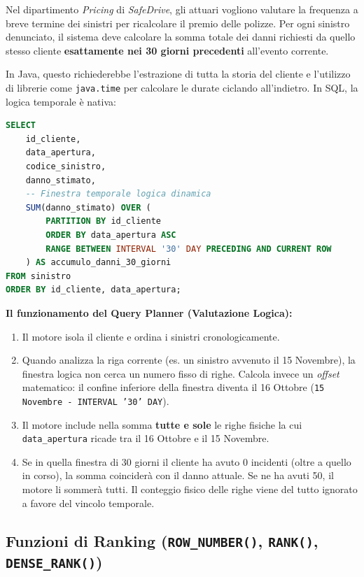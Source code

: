 \begin{example}
Nel dipartimento \textit{Pricing} di \textit{SafeDrive}, gli attuari vogliono valutare la frequenza a breve termine dei sinistri per ricalcolare il premio delle polizze. Per ogni sinistro denunciato, il sistema deve calcolare la somma totale dei danni richiesti da quello stesso cliente \textbf{esattamente nei 30 giorni precedenti} all'evento corrente.

In Java, questo richiederebbe l'estrazione di tutta la storia del cliente e l'utilizzo di librerie come \texttt{java.time} per calcolare le durate ciclando all'indietro. In SQL, la logica temporale è nativa:

\begin{lstlisting}[language=SQL, basicstyle=\ttfamily\small, keywordstyle=\color{blue}\bfseries]
SELECT 
    id_cliente,
    data_apertura,
    codice_sinistro,
    danno_stimato,
    -- Finestra temporale logica dinamica
    SUM(danno_stimato) OVER (
        PARTITION BY id_cliente
        ORDER BY data_apertura ASC
        RANGE BETWEEN INTERVAL '30' DAY PRECEDING AND CURRENT ROW
    ) AS accumulo_danni_30_giorni
FROM sinistro
ORDER BY id_cliente, data_apertura;
\end{lstlisting}

\textbf{Il funzionamento del Query Planner (Valutazione Logica):}
\begin{enumerate}
    \item Il motore isola il cliente e ordina i sinistri cronologicamente.
    \item Quando analizza la riga corrente (es. un sinistro avvenuto il 15 Novembre), la finestra logica non cerca un numero fisso di righe. Calcola invece un \textit{offset} matematico: il confine inferiore della finestra diventa il 16 Ottobre (\texttt{15 Novembre - INTERVAL '30' DAY}).
    \item Il motore include nella somma \textbf{tutte e sole} le righe fisiche la cui \texttt{data\_apertura} ricade tra il 16 Ottobre e il 15 Novembre.
    \item Se in quella finestra di 30 giorni il cliente ha avuto 0 incidenti (oltre a quello in corso), la somma coinciderà con il danno attuale. Se ne ha avuti 50, il motore li sommerà tutti. Il conteggio fisico delle righe viene del tutto ignorato a favore del vincolo temporale.
\end{enumerate}
\end{example}

\subsection{Funzioni di Ranking (\texttt{ROW\_NUMBER()}, \texttt{RANK()}, \texttt{DENSE\_RANK()})}

